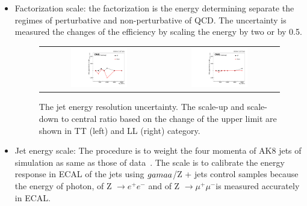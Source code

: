 \begin{itemize}
	\item Factorization scale: the factorization is the energy determining separate the regimes of perturbative and non-perturbative of QCD. The uncertainty is measured the changes of the efficiency by scaling the energy by two or by 0.5.
  
  \begin{figure}[t]
  \centering
 \begin{tabular}{cc}
    \includegraphics[width=0.5\textwidth]{Figures/plots_uncert/JER_TT.pdf} &
   \includegraphics[width=0.5\textwidth]{Figures/plots_uncert/JER_LL.pdf} \\
  \end{tabular}
  \caption{The jet energy resolution uncertainty. The scale-up and scale-down to central ratio based on the change of the upper limit are shown in TT (left) and LL (right) category.}

\end{figure}  
  \item Jet energy scale: The procedure is to weight the four momenta of AK8 jets of simulation as same as those of data~\citep{Chatrchyan:2011ds}. The scale is to calibrate the energy response in ECAL of the jets using $\\gamaa$/Z + jets control samples because the energy of photon, of Z $\rightarrow e^+e^-$ and of Z $\rightarrow \mu^+\mu^-$is measured accurately in ECAL.
  

\end{itemize}
